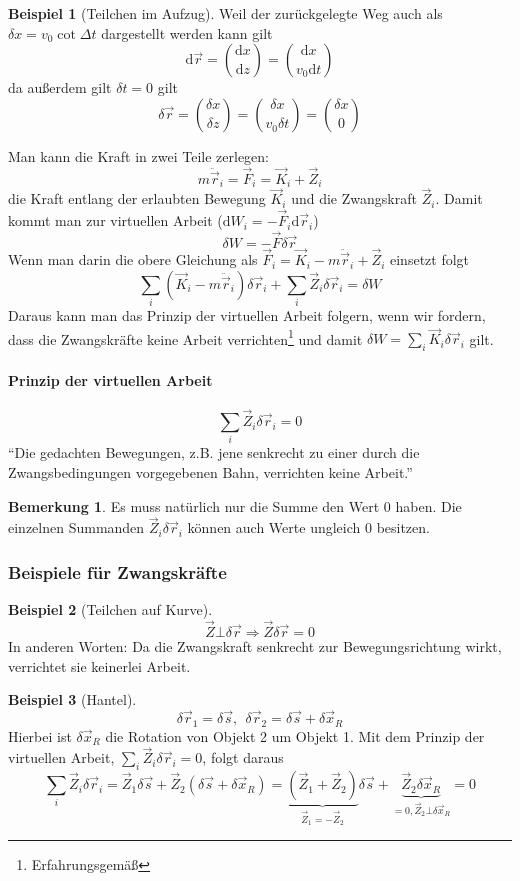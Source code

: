 \documentclass[oneside]{book}
\theoremstyle{definition}
\newtheorem*{bemerkung*}{Bemerkung}
\newtheorem*{beispiel*}{Beispiel}
\renewcommand{\d}{\mathrm d}
\newcommand{\rvec}{\vec{r}}
\newcommand{\ddotvec}[1]{\ddot{\vec{#1}}}
\begin{document}
\begin{beispiel*}[Teilchen im Aufzug]
Weil der zurückgelegte Weg auch als $\delta x = v_0 \cot \Delta t$ dargestellt werden kann gilt
$$\d \vec{r} = \binom{\d x}{\d z} = \binom{\d x}{ v_0 \d t}$$
da außerdem gilt $\delta t = 0$ gilt
$$\delta \vec{r} = \binom{\delta x}{\delta z} = \binom{\delta x}{v_0 \delta t} = \binom{\delta x}{0}$$
\end{beispiel*}
Man kann die Kraft in zwei Teile zerlegen:
$$m \ddotvec{r}_i = \vec{F}_i = \vec{K}_i + \vec{Z}_i$$
die Kraft entlang der erlaubten Bewegung $\vec{K}_i$ und die Zwangskraft $\vec{Z}_i$. Damit kommt man zur virtuellen Arbeit ($\d W_i = - \vec{F}_i \d \vec{r}_i$)
$$\delta W = - \vec{F} \delta \vec{r}$$
Wenn man darin die obere Gleichung als $\vec{F}_i = \vec{K}_i - m \ddotvec{r}_i + \vec{Z}_i$ einsetzt folgt
$$\sum_i (\vec{K}_i - m \ddot{\vec{r}}_i) \delta \vec{r}_i + \sum_i \vec{Z}_i \delta \vec{r}_i = \delta W$$
Daraus kann man das Prinzip der virtuellen Arbeit folgern, wenn wir fordern, dass die Zwangskräfte keine Arbeit verrichten\footnote{Erfahrungsgemäß} und damit $\delta W = \sum_i \vec{K}_i \delta \rvec_i$ gilt.

\paragraph{Prinzip der virtuellen Arbeit}
$$\sum_i \vec{Z}_i \delta \vec{r}_i = 0$$
"`Die gedachten Bewegungen, z.B. jene senkrecht zu einer durch die Zwangsbedingungen vorgegebenen Bahn, verrichten keine Arbeit."'

\begin{bemerkung*}
	Es muss natürlich nur die Summe den Wert 0 haben. Die einzelnen Summanden $\vec{Z}_i \delta \rvec_i$ können auch Werte ungleich 0 besitzen.
\end{bemerkung*}

\subsubsection{Beispiele für Zwangskräfte}

\begin{beispiel*}[Teilchen auf Kurve]
$$\vec{Z} \bot \delta \vec{r} \Rightarrow \vec{Z} \delta \vec{r} = 0$$
In anderen Worten: Da die Zwangskraft senkrecht zur Bewegungsrichtung wirkt, verrichtet sie keinerlei Arbeit. 
\end{beispiel*}

\begin{beispiel*}[Hantel]
$$\delta \vec{r}_1 = \delta\vec{s},~~ \delta \vec{r}_2 = \delta \vec{s} + \delta \vec{x}_R$$
Hierbei ist $\delta \vec{x}_R$ die Rotation von Objekt 2 um Objekt 1.
Mit dem Prinzip der virtuellen Arbeit, $\sum_i \vec{Z}_i \delta \vec{r}_i = 0$, folgt daraus
$$\sum_i \vec Z_i \delta \vec{r}_i = \vec{Z}_1 \delta \vec{s} + \vec{Z}_2 (\delta \vec{s} + \delta \vec{x}_R) 
= \underbrace{(\vec{Z}_1 + \vec{Z}_2)}_{\vec{Z}_1 = - \vec{Z}_2} \delta \vec{s} + \underbrace{\vec{Z}_2 \delta \vec{x}_R}_{= 0, \vec{Z}_2 \bot \delta \vec{x}_R} = 0$$
\end{beispiel*}
\end{document}
